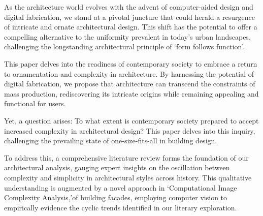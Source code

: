 


As the architecture world evolves with the advent of computer-aided design and digital fabrication, we stand at a pivotal juncture that could herald a resurgence of intricate and ornate architectural design.
This shift has the potential to offer a compelling alternative to the uniformity prevalent in today's urban landscapes, challenging the longstanding architectural principle of `form follows function'\cite{Gage2015}.

This paper delves into the readiness of contemporary society to embrace a return to ornamentation and complexity in architecture.
By harnessing the potential of digital fabrication, we propose that architecture can transcend the constraints of mass production, rediscovering its intricate origins while remaining appealing and functional for users.

Yet, a question arises: To what extent is contemporary society prepared to accept increased complexity in architectural design?
This paper delves into this inquiry, challenging the prevailing state of one-size-fits-all in building design.

To address this, a comprehensive literature review forms the foundation of our architectural analysis, gauging expert insights on the oscillation between complexity and simplicity in architectural styles across history.
This qualitative understanding is augmented by a novel approach in `Computational Image Complexity Analysis,'of building facades, employing computer vision to empirically evidence the cyclic trends identified in our literary exploration.

